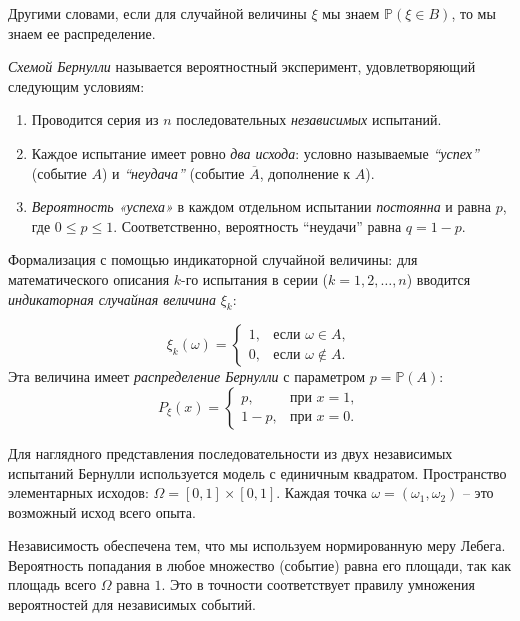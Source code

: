 \documentclass[12pt,a4paper]{article}
\begin{document}
\begin{remark}
    Другими словами, если для случайной величины \(\xi\) мы знаем \(\mathbb{P}(\xi \in B)\), то мы знаем ее распределение.
\end{remark}

\begin{definition}
    \textit{Схемой Бернулли} называется вероятностный эксперимент, удовлетворяющий следующим условиям:

\begin{enumerate}
    \item Проводится серия из $n$ последовательных \textit{независимых} испытаний.
    \item Каждое испытание имеет ровно \textit{два исхода}: условно называемые \textit{``успех''} (событие $A$) и \textit{``неудача''} (событие $\overline{A}$, дополнение к $A$).
    \item \textit{Вероятность «успеха»} в каждом отдельном испытании \textit{постоянна} и равна $p$, где $0 \leq p \leq 1$. Соответственно, вероятность ``неудачи'' равна $q = 1 - p$.
\end{enumerate}
Формализация с помощью индикаторной случайной величины: для математического описания $k$-го испытания в серии ($k = 1, 2, \dots, n$) вводится \textit{индикаторная случайная величина} $\xi_k$:

\[
\xi_k(\omega) = 
\begin{cases}
1, & \text{если } \omega \in A, \\
0, & \text{если } \omega \notin A .
\end{cases}
\]
Эта величина имеет \textit{распределение Бернулли} с параметром $p = \mathbb{P}(A)$:
\[
P_{\xi}(x) = 
\begin{cases}
p, & \text{при } x = 1, \\
1 - p, & \text{при } x = 0.
\end{cases}
\]
\end{definition}

\begin{example}[Геометрическая модель схемы Бернулли для \(n = 2\)]
    Для наглядного представления последовательности из двух независимых испытаний Бернулли используется модель с единичным квадратом. Пространство элементарных исходов: \( \Omega = [0, 1] \times [0,1]\). Каждая точка \(\omega = (\omega_1, \omega_2)\) -- это возможный исход всего опыта.

    Независимость обеспечена тем, что мы используем нормированную меру Лебега. Вероятность попадания в любое множество (событие) равна его площади, так как площадь всего \(\Omega\) равна \(1\). Это в точности соответствует правилу умножения вероятностей для независимых событий.
\end{example}
\end{document}
